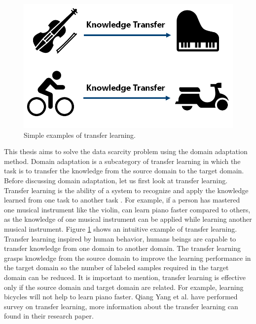 \begin{figure}[H]
        \begin{center}
 	    \includegraphics[scale=0.40]{images/Introduction/TransferLearning.png}
	    \caption[Simple examples of transfer learning.]{Simple examples of transfer learning.}
	    \label{fig:TransferLearning}
	    \end{center}
\end{figure}

This thesis aims to solve the data scarcity problem using the domain adaptation method. Domain adaptation is a subcategory of transfer learning in which the task is to transfer the knowledge from the source domain to the target domain. Before discussing domain adaptation, let us first look at transfer learning. Transfer learning is the ability of a system to recognize and apply the knowledge learned from one task to another task \cite{zhuang2020comprehensive}.  For example, if a person has mastered one musical instrument like the violin, can learn piano faster compared to others, as the knowledge of one musical instrument can be applied while learning another musical instrument. Figure \ref{fig:TransferLearning} shows an intuitive example of transfer learning. Transfer learning inspired by human behavior, humans beings are capable to transfer knowledge from one domain to another domain. The transfer learning grasps knowledge from the source domain to improve the learning performance in the target domain so the number of labeled samples required in the target domain can be reduced. It is important to mention, transfer learning is effective only if the source domain and target domain are related. For example, learning bicycles will not help to learn piano faster. Qiang Yang et al.\cite{5288526} have performed survey on transfer learning, more information about the transfer learning can found in their research paper.  


